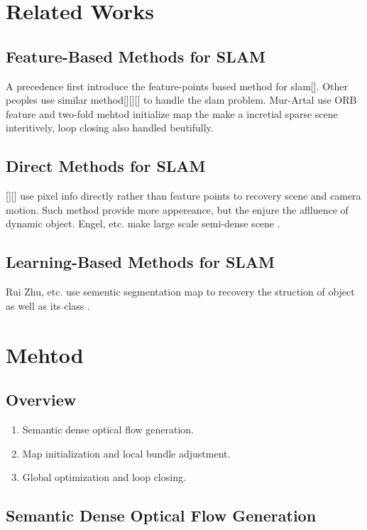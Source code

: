 \documentclass{article}
\begin{document}
\section{Related Works}

\subsection{Feature-Based Methods for SLAM}

A precedence first introduce the feature-points based method for slam[]. Other peoples use similar method[][][] to handle the slam problem. Mur-Artal use ORB feature and two-fold mehtod initialize map the make a incretial sparse scene interitively, loop closing also handled beutifully.

\subsection{Direct Methods for SLAM}

[][] use pixel info directly rather than feature points to recovery scene and camera motion. Such method provide more appereance, but the enjure the aflluence of dynamic object. Engel, etc. make large scale semi-dense scene \cite{Engel2014LSD}. 

\subsection{Learning-Based Methods for SLAM}

Rui Zhu, etc. use sementic segmentation map to recovery the struction of object as well as its class \cite{Rui2018Semantic}.

\section{Mehtod}

\subsection{Overview}


\begin{enumerate}
\item Semantic dense optical flow generation.
\item Map initialization and local bundle adjustment.
\item Global optimization and loop closing.
\end{enumerate}

\subsection{Semantic Dense Optical Flow Generation}
\end{document}
